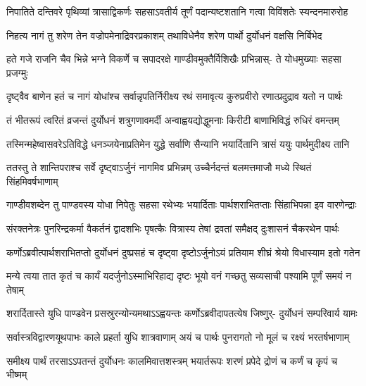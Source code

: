 \fourlineindentedshloka
{निपातिते दन्तिवरे पृथिव्यां}
{त्रासाद्विकर्णः सहसाऽवतीर्य}
{तूर्णं पदान्यष्टशतानि गत्वा}
{विविंशतेः स्यन्दनमारुरोह}


\fourlineindentedshloka
{निहत्य नागं तु शरेण तेन}
{वज्रोपमेनाद्रिवरप्रकाशम्}
{तथाविधेनैव शरेण पार्थो}
{दुर्योधनं वक्षसि निर्बिभेद}


\fourlineindentedshloka
{हते गजे राजनि चैव भिन्ने}
{भग्ने विकर्णे च सपादरक्षे}
{गाण्डीवमुक्तैर्विशिखैः प्रभिन्नास्-}
{ते योधमुख्याः सहसा प्रजग्मुः}


\fourlineindentedshloka
{दृष्ट्वैव बाणेन हतं च नागं}
{योधांश्च सर्वान्नृपतिर्निरीक्ष्य}
{रथं समावृत्य कुरुप्रवीरो}
{रणात्प्रदुद्राव यतो न पार्थः}


\fourlineindentedshloka
{तं भीतरूपं त्वरितं व्रजन्तं}
{दुर्योधनं शत्रुगणावमर्दी}
{अन्वाह्वयद्योद्धुमनाः किरीटी}
{बाणाभिविद्धं रुधिरं वमन्तम्}


\fourlineindentedshloka
{तस्मिन्महेष्वासवरेऽतिविद्धे}
{धनञ्जयेनाप्रतिमेन युद्धे}
{सर्वाणि सैन्यानि भयार्दितानि}
{त्रासं ययुः पार्थमुदीक्ष्य तानि}


\fourlineindentedshloka
{ततस्तु ते शान्तिपराश्च सर्वे}
{दृष्ट्वाऽर्जुनं नागमिव प्रभिन्नम्}
{उच्चैर्नदन्तं बलमत्तमाजौ}
{मध्ये स्थितं सिंहमिवर्षभाणाम्}


\fourlineindentedshloka
{गाण्डीवशब्देन तु पाण्डवस्य}
{योधा निपेतुः सहसा रथेभ्यः}
{भयार्दिताः पार्थशराभितप्ताः}
{सिंहाभिपन्ना इव वारणेन्द्राः}


\fourlineindentedshloka
{संरक्तनेत्रः पुनरिन्द्रकर्मा}
{वैकर्तनं द्वादशभिः पृषत्कैः}
{वित्रास्य तेषां द्रवतां समैक्षद्}
{दुःशासनं चैकरथेन पार्थः}


\fourlineindentedshloka
{कर्णोऽब्रवीत्पार्थशराभितप्तो}
{दुर्योधनं दुष्प्रसहं च दृष्ट्वा}
{दृष्टोऽर्जुनोऽयं प्रतियाम शीघ्रं}
{श्रेयो विधास्याम इतो गतेन}


\fourlineindentedshloka
{मन्ये त्वया तात कृतं च कार्यं}
{यदर्जुनोऽस्माभिरिहाद्य दृष्टः}
{भूयो वनं गच्छतु सव्यसाची}
{पश्यामि पूर्णं समयं न तेषाम्}



\fourlineindentedshloka
{शरार्दितास्ते युधि पाण्डवेन}
{प्रसस्रुरन्योन्यमथाऽऽह्वयन्तः}
{कर्णोऽब्रवीदापतत्येष जिष्णुर्-}
{दुर्योधनं सम्परिवार्य यामः}


\fourlineindentedshloka
{सर्वास्त्रविद्वारणयूथपाभः}
{काले प्रहर्ता युधि शात्रवाणाम्}
{अयं च पार्थः पुनरागतो नो}
{मूलं च रक्ष्यं भरतर्षभाणाम्}


\fourlineindentedshloka
{समीक्ष्य पार्थं तरसाऽऽपतन्तं}
{दुर्योधनः कालमिवात्तशस्त्रम्}
{भयार्तरूपः शरणं प्रपेदे}
{द्रोणं च कर्णं च कृपं च भीष्मम्}


